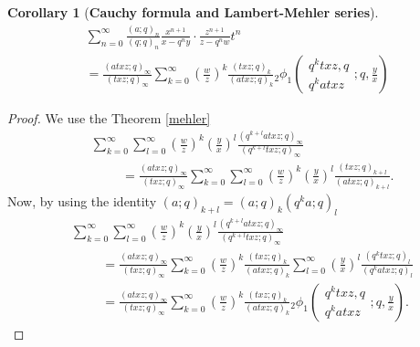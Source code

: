 \documentclass[12pt]{article}
\newtheorem{corollary}{Corollary}
\begin{document}
\begin{corollary}[\bf Cauchy formula and Lambert-Mehler series]\label{cor_CGML}
    \begin{multline}
        \sum_{n=0}^{\infty}\frac{(a;q)_n}{(q;q)_n}\frac{x^{n+1}}{x-q^ny}\cdot\frac{z^{n+1}}{z-q^nw}t^n\\=\frac{(atxz;q)_\infty}{(txz;q)_\infty}\sum_{k=0}^{\infty}\left(\frac{w}{z}\right)^k\frac{(txz;q)_k}{(atxz;q)_k}{}_{2}\phi_{1}\left(
    \begin{array}{c}
         q^ktxz,q \\
         q^katxz
    \end{array}
    ;q,\frac{y}{x}
    \right)
    \end{multline}
\end{corollary}
\begin{proof}
We use the Theorem \ref{mehler}
    \begin{align*}
        &\sum_{k=0}^{\infty}\sum_{l=0}^{\infty}\left(\frac{w}{z}\right)^k\left(\frac{y}{x}\right)^l\frac{(q^{k+l}atxz;q)_\infty}{(q^{k+l}txz;q)_\infty}\\
        &\hspace{1cm}=\frac{(atxz;q)_\infty}{(txz;q)_\infty}\sum_{k=0}^{\infty}\sum_{l=0}^{\infty}\left(\frac{w}{z}\right)^k\left(\frac{y}{x}\right)^l\frac{(txz;q)_{k+l}}{(atxz;q)_{k+l}}.
     \end{align*}
Now, by using the identity $(a;q)_{k+l}=(a;q)_k(q^ka;q)_l$     
     \begin{align*}
        &\sum_{k=0}^{\infty}\sum_{l=0}^{\infty}\left(\frac{w}{z}\right)^k\left(\frac{y}{x}\right)^l\frac{(q^{k+l}atxz;q)_\infty}{(q^{k+l}txz;q)_\infty}\\
        &\hspace{1cm}=\frac{(atxz;q)_\infty}{(txz;q)_\infty}\sum_{k=0}^{\infty}\left(\frac{w}{z}\right)^k\frac{(txz;q)_k}{(atxz;q)_k}\sum_{l=0}^{\infty}\left(\frac{y}{x}\right)^l\frac{(q^ktxz;q)_{l}}{(q^katxz;q)_{l}}\\
        &\hspace{1cm}=\frac{(atxz;q)_\infty}{(txz;q)_\infty}\sum_{k=0}^{\infty}\left(\frac{w}{z}\right)^k\frac{(txz;q)_k}{(atxz;q)_k}{}_{2}\phi_{1}\left(
    \begin{array}{c}
         q^ktxz,q \\
         q^katxz
    \end{array}
    ;q,\frac{y}{x}
    \right).
    \end{align*}
\end{proof}
\end{document}
